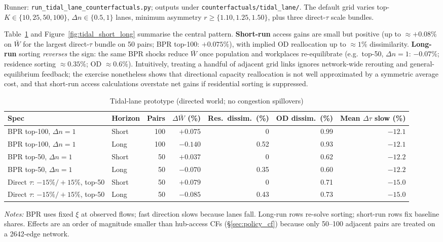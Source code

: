 \documentclass[12pt]{article}
\newcommand{\Wbar}{\bar W}
\begin{document}
Runner: \texttt{run\_tidal\_lane\_counterfactuals.py}; outputs under
\texttt{counterfactuals/tidal\_lane/}.
The default grid varies top-$K\in\{10,25,50,100\}$, $\Delta n\in\{0.5,1\}$ lanes,
minimum asymmetry $r\ge\{1.10,1.25,1.50\}$, plus three direct-$\tau$ scale bundles.

Table~\ref{tab:tidal_lane} and Figure~\ref{fig:tidal_short_long} summarise the
central pattern.
\textbf{Short-run} access gains are small but positive (up to $\approx +0.08\%$ on
$\Wbar$ for the largest direct-$\tau$ bundle on 50 pairs; BPR top-100:
$+0.075\%$), with implied OD reallocation up to $\approx 1\%$ dissimilarity.
\textbf{Long-run} sorting \emph{reverses} the sign: the same BPR shocks reduce
$\Wbar$ once population and workplaces re-equilibrate (e.g.\ top-50, $\Delta n=1$:
$-0.07\%$; residence sorting $\approx 0.35\%$; OD $\approx 0.6\%$).
Intuitively, treating a handful of adjacent grid links ignores network-wide rerouting
and general-equilibrium feedback; the exercise nonetheless shows that directional
capacity reallocation is not well approximated by a symmetric average cost, and
that short-run access calculations overstate net gains if residential sorting is
suppressed.

\begin{table}[htbp]
  \centering
  \caption{Tidal-lane prototype (directed world; no congestion spillovers)}
  \label{tab:tidal_lane}
  \small
  \begin{tabular}{llrrrrr}
  \toprule
  Spec & Horizon & Pairs & $\Delta\Wbar$ (\%) & Res.\ dissim.\ (\%) & OD dissim.\ (\%) & Mean $\Delta\tau$ slow (\%) \\
  \midrule
  BPR top-100, $\Delta n=1$ & Short & 100 & $+0.075$ & 0 & 0.99 & $-12.1$ \\
  BPR top-100, $\Delta n=1$ & Long  & 100 & $-0.140$ & 0.52 & 0.93 & $-12.1$ \\
  BPR top-50, $\Delta n=1$  & Short & 50  & $+0.037$ & 0 & 0.62 & $-12.2$ \\
  BPR top-50, $\Delta n=1$  & Long  & 50  & $-0.070$ & 0.35 & 0.60 & $-12.2$ \\
  Direct $\tau$: $-15\%/+15\%$, top-50 & Short & 50 & $+0.079$ & 0 & 0.71 & $-15.0$ \\
  Direct $\tau$: $-15\%/+15\%$, top-50 & Long  & 50 & $-0.085$ & 0.43 & 0.73 & $-15.0$ \\
  \bottomrule
  \end{tabular}
  \vspace{0.4em}

  \begin{minipage}{0.92\textwidth}
  \footnotesize
  \emph{Notes:} BPR uses fixed $\xi$ at observed flows; fast direction slows because
  lanes fall. Long-run rows re-solve sorting; short-run rows fix baseline shares.
  Effects are an order of magnitude smaller than hub-access CFs
  (\S\ref{sec:policy_cf}) because only 50--100 adjacent pairs are treated on a
  2642-edge network.
  \end{minipage}
\end{table}
\end{document}
